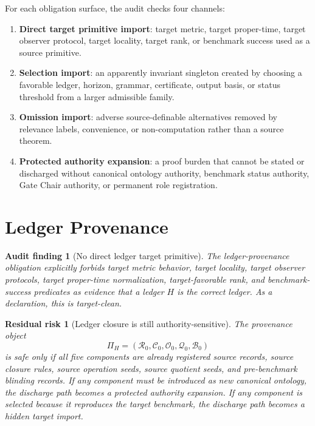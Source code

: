 \documentclass[11pt]{article}
\newtheorem{auditfinding}{Audit finding}
\newtheorem{risk}{Residual risk}
\begin{document}
For each obligation surface, the audit checks four channels:

\begin{enumerate}
    \item \textbf{Direct target primitive import}: target metric, target
    proper-time, target observer protocol, target locality, target rank, or
    benchmark success used as a source primitive.
    \item \textbf{Selection import}: an apparently invariant singleton created
    by choosing a favorable ledger, horizon, grammar, certificate, output
    basis, or status threshold from a larger admissible family.
    \item \textbf{Omission import}: adverse source-definable alternatives
    removed by relevance labels, convenience, or non-computation rather than a
    source theorem.
    \item \textbf{Protected authority expansion}: a proof burden that cannot
    be stated or discharged without canonical ontology authority, benchmark
    status authority, Gate Chair authority, or permanent role registration.
\end{enumerate}

\section{Ledger Provenance}

\begin{auditfinding}[No direct ledger target primitive]
The ledger-provenance obligation explicitly forbids target metric behavior,
target locality, target observer protocols, target proper-time normalization,
target-favorable rank, and benchmark-success predicates as evidence that a
ledger \(H\) is the correct ledger. As a declaration, this is target-clean.
\end{auditfinding}

\begin{risk}[Ledger closure is still authority-sensitive]
The provenance object
\[
\Pi_H=(\mathcal{R}_{0},\mathcal{C}_{0},\mathcal{O}_{0},
\mathcal{Q}_{0},\mathcal{B}_{0})
\]
is safe only if all five components are already registered source records,
source closure rules, source operation seeds, source quotient seeds, and
pre-benchmark blinding records. If any component must be introduced as new
canonical ontology, the discharge path becomes a protected authority
expansion. If any component is selected because it reproduces the target
benchmark, the discharge path becomes a hidden target import.
\end{risk}
\end{document}
